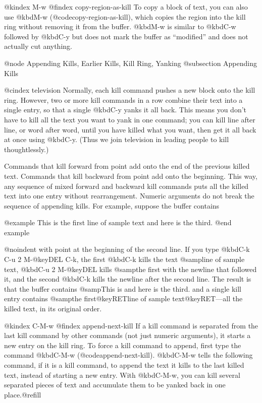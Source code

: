 {{{{@kindex M-w
@findex copy-region-as-kill
 To copy a block of text, you can also use @kbd{M-w}
(@code{copy-region-as-kill}), which copies the region into the kill ring
without removing it from the buffer. @kbd{M-w} is similar to @kbd{C-w}
followed by @kbd{C-y} but does not mark the buffer as ``modified'' and
does not actually cut anything.

@node Appending Kills, Earlier Kills, Kill Ring, Yanking
@subsection Appending Kills

@cindex television
  Normally, each kill command pushes a new block onto the kill ring.
However, two or more kill commands in a row combine their text into a
single entry, so that a single @kbd{C-y} yanks it all back. This means
you don't have to kill all the text you want to yank in one command; you
can kill line after line, or word after word, until you have killed what
you want, then get it all back at once using @kbd{C-y}. (Thus we join
television in leading people to kill thoughtlessly.)

  Commands that kill forward from point add onto the end of the previous
killed text.  Commands that kill backward from point add onto the
beginning.  This way, any sequence of mixed forward and backward kill
commands puts all the killed text into one entry without rearrangement.
Numeric arguments do not break the sequence of appending kills.  For
example, suppose the buffer contains

@example
This is the first
line of sample text
and here is the third.
@end example

@noindent
with point at the beginning of the second line.  If you type @kbd{C-k C-u 2
M-@key{DEL} C-k}, the first @kbd{C-k} kills the text @samp{line of sample
text}, @kbd{C-u 2 M-@key{DEL}} kills @samp{the first} with the newline that
followed it, and the second @kbd{C-k} kills the newline after the second
line.  The result is that the buffer contains @samp{This is and here is the
third.} and a single kill entry contains @samp{the first@key{RET}line of
sample text@key{RET}}---all the killed text, in its original order.

@kindex C-M-w
@findex append-next-kill
  If a kill command is separated from the last kill command by other
commands (not just numeric arguments), it starts a new entry on the kill
ring.  To force a kill command to append, first type the command @kbd{C-M-w}
(@code{append-next-kill}). @kbd{C-M-w} tells the following command,
if it is a kill command, to append the text it kills to the last killed
text, instead of starting a new entry.  With @kbd{C-M-w}, you can kill
several separated pieces of text and accumulate them to be yanked back
in one place.@refill

}}}}
